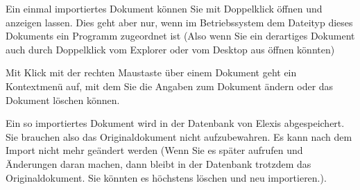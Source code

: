 Ein einmal importiertes Dokument können Sie mit Doppelklick öffnen und anzeigen lassen.  Dies geht aber nur, wenn im Betriebssystem dem Dateityp dieses Dokuments ein Programm zugeordnet ist (Also wenn Sie ein derartiges Dokument auch durch Doppelklick vom Explorer oder vom Desktop aus öffnen könnten)

Mit Klick mit der rechten Maustaste über einem Dokument geht ein Kontextmenü auf, mit dem Sie die Angaben zum Dokument ändern oder das Dokument löschen können.

Ein so importiertes Dokument wird in der Datenbank von Elexis abgespeichert. Sie brauchen also das Originaldokument nicht aufzubewahren. Es kann nach dem Import nicht mehr geändert werden (Wenn Sie es später aufrufen und Änderungen daran machen, dann bleibt in der Datenbank trotzdem das Originaldokument. Sie könnten es höchstens löschen und neu importieren.).



